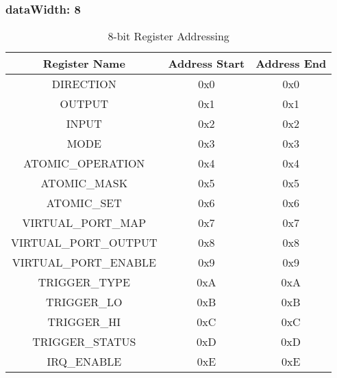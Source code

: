 \subsubsection{dataWidth: 8}
\begin{table}[h]
  \centering
  \begin{tabular}{|c|c|c|}
      \hline
      \textbf{Register Name} & \textbf{Address Start} & \textbf{Address End} \\ \hline
      DIRECTION & 0x0 & 0x0 \\ \hline
      OUTPUT & 0x1 & 0x1\\ \hline
      INPUT & 0x2 & 0x2 \\ \hline
      MODE & 0x3 & 0x3\\ \hline
      ATOMIC\_OPERATION & 0x4 & 0x4 \\ \hline
      ATOMIC\_MASK & 0x5 & 0x5\\ \hline
      ATOMIC\_SET & 0x6 & 0x6 \\ \hline
      VIRTUAL\_PORT\_MAP & 0x7 & 0x7 \\ \hline
      VIRTUAL\_PORT\_OUTPUT & 0x8 & 0x8 \\ \hline
      VIRTUAL\_PORT\_ENABLE & 0x9 & 0x9\\ \hline
      TRIGGER\_TYPE & 0xA & 0xA\\ \hline
      TRIGGER\_LO & 0xB & 0xB \\ \hline
      TRIGGER\_HI & 0xC & 0xC \\ \hline
      TRIGGER\_STATUS & 0xD & 0xD \\ \hline
      IRQ\_ENABLE & 0xE & 0xE\\ \hline
  \end{tabular}
  \caption{8-bit Register Addressing}
\end{table}

\newpage

